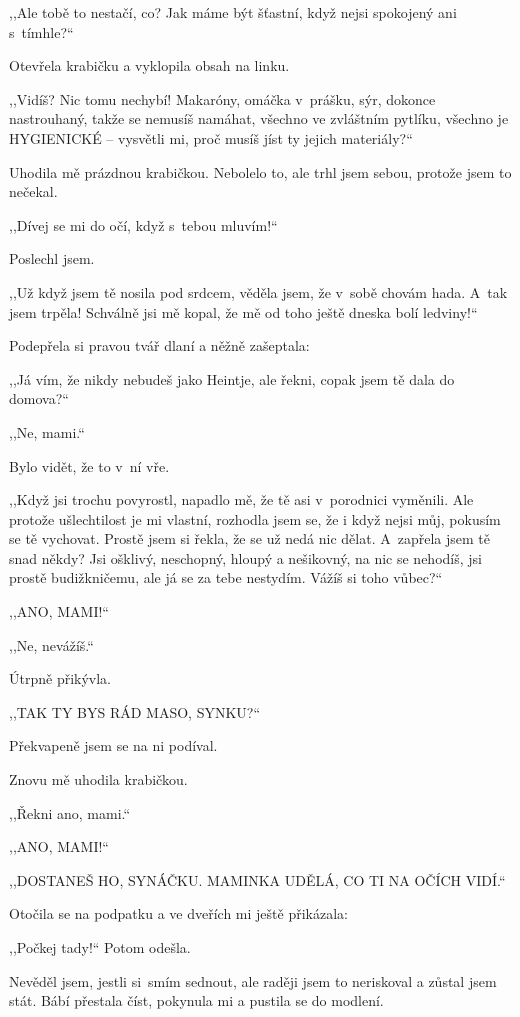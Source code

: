 ,,Ale tobě to nestačí, co? Jak máme být šťastní, když nejsi spokojený ani s tímhle?``

Otevřela krabičku a vyklopila obsah na linku.

,,Vidíš? Nic tomu nechybí! Makaróny, omáčka v prášku, sýr, dokonce nastrouhaný, takže se nemusíš namáhat, všechno ve zvláštním pytlíku, všechno je HYGIENICKÉ -- vysvětli mi, proč musíš jíst ty jejich materiály?``

Uhodila mě prázdnou krabičkou. Nebolelo to, ale trhl jsem sebou, protože jsem to nečekal. 

,,Dívej se mi do očí, když s tebou mluvím!``

Poslechl jsem.

,,Už když jsem tě nosila pod srdcem, věděla jsem, že v sobě chovám hada. A~tak jsem trpěla! Schválně jsi mě kopal, že mě od toho ještě dneska bolí ledviny!``

Podepřela si pravou tvář dlaní a něžně zašeptala:

,,Já vím, že nikdy nebudeš jako Heintje, ale řekni, copak jsem tě dala do domova?``

,,Ne, mami.``

Bylo vidět, že to v ní vře.

,,Když jsi trochu povyrostl, napadlo mě, že tě asi v porodnici vyměnili. Ale protože ušlechtilost je mi vlastní, rozhodla jsem se, že i když nejsi můj, pokusím se tě vychovat. Prostě jsem si řekla, že se už nedá nic dělat. A~zapřela jsem tě snad někdy? Jsi ošklivý, neschopný, hloupý a nešikovný, na nic se nehodíš, jsi prostě budižkničemu, ale já se za tebe nestydím. Vážíš si toho vůbec?``

,,ANO, MAMI!``

,,Ne, nevážíš.``

Útrpně přikývla.

,,TAK TY BYS RÁD MASO, SYNKU?``

Překvapeně jsem se na ni podíval.

Znovu mě uhodila krabičkou.

,,Řekni ano, mami.``

,,ANO, MAMI!``

,,DOSTANEŠ HO, SYNÁČKU. MAMINKA UDĚLÁ, CO TI NA OČÍCH VIDÍ.``

Otočila se na podpatku a ve dveřích mi ještě přikázala:

,,Počkej tady!`` Potom odešla.

Nevěděl jsem, jestli si smím sednout, ale raději jsem to neriskoval a zůstal jsem stát. Bábí přestala číst, pokynula mi a pustila se do modlení.

